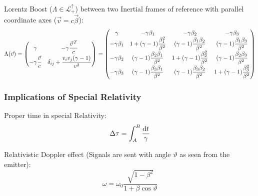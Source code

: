 			\noindent
			Lorentz Boost ($\Lambda\in\mathcal{L}^\uparrow_+$) between two Inertial frames of reference with parallel coordinate axes ($\vec{v}=c\vec{\beta}$):%
			\begin{equation}
				\Lambda(\vec{v}) = \left( \begin{matrix}
					\gamma & -\gamma\dfrac{\pvec{v}^T}{c} \\[6pt]
					-\gamma\dfrac{\vec{v}}{c} & \delta_{ij}+\dfrac{v_i v_j(\gamma-1)}{v^2}
					\end{matrix} \right)
					=
					\left(\begin{matrix}
						\gamma & -\gamma \beta_1 & -\gamma \beta_2 & -\gamma \beta_3 \\
						-\gamma \beta_1 & 1+(\gamma -1){\dfrac {\beta_1^{2}}{\beta^{2}}} & (\gamma -1){\dfrac {\beta_1 \beta_2}{\beta^{2}}}&(\gamma -1){\dfrac {\beta_1\beta_3}{\beta^{2}}} \\
						-\gamma \beta_2 & (\gamma -1){\dfrac {\beta_2\beta_1}{\beta^{2}}} & 1+(\gamma -1){\dfrac {\beta_2^{2}}{\beta^{2}}}&(\gamma -1){\dfrac {\beta_2 \beta_3}{\beta^{2}}} \\
						-\gamma \beta_3 &(\gamma -1){\dfrac {\beta_3\beta_1}{\beta^{2}}}&(\gamma -1){\dfrac {\beta_3\beta_2}{\beta^{2}}}&1+(\gamma -1){\dfrac {\beta_3^{2}}{\beta^{2}}}
					\end{matrix}\right)
			\end{equation}

		\subsubsection{Implications of Special Relativity}
			\noindent
			Proper time in special Relativity:%
			\begin{equation}
				\Delta\tau = \int_A^B \frac{\mathrm{d} t}{\gamma}
			\end{equation}

			\noindent
			Relativistic Doppler effect (Signals are sent with angle $\vartheta$ as seen from the emitter):%
			\begin{equation}
				\omega = \omega_0\frac{\sqrt{1-\beta^2}}{1+\beta\cos\vartheta}
			\end{equation}


